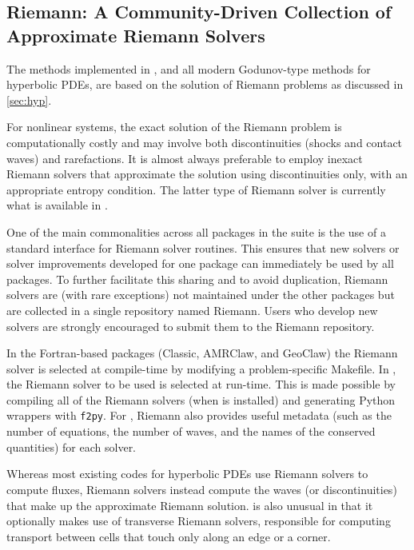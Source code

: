 %
%

\subsection{Riemann: A Community-Driven Collection of Approximate Riemann
Solvers}\label{sec:riemann}

The methods implemented in \clawpack, and all modern Godunov-type methods for
hyperbolic PDEs, are based on the solution of Riemann problems as discussed
in \cref{sec:hyp}.  

For nonlinear systems, the exact solution of the Riemann problem is
computationally costly and may involve both discontinuities (shocks and contact
waves) and rarefactions.  It is almost always preferable to employ inexact
Riemann solvers that approximate the solution using discontinuities only, with
an appropriate entropy condition.  The latter type of Riemann solver is
currently what is available in \clawpack.  

One of the main commonalities across all packages in the \clawpack suite is the
use of a standard interface for Riemann solver routines.  This ensures that new
solvers or solver improvements developed for one package can immediately
be used by all packages.  To further facilitate this sharing and to avoid 
duplication, Riemann solvers are (with rare exceptions) not maintained under
the other packages but are collected in a single repository named Riemann.
Users who develop new solvers are strongly encouraged to submit them to the
Riemann repository.

In the Fortran-based packages (Classic, AMRClaw, and GeoClaw) the Riemann solver
is selected at compile-time by modifying a problem-specific Makefile. In
\pyclaw, the Riemann solver to be used is selected at run-time.  This is made
possible by compiling all of the Riemann solvers (when \pyclaw is installed) and
generating Python wrappers with \texttt{f2py}.  For \pyclaw, Riemann also
provides useful metadata (such as the number of equations, the number of waves,
and the names of the conserved quantities) for each solver.

Whereas most existing codes for hyperbolic PDEs use Riemann solvers to
compute fluxes, \clawpack Riemann solvers instead compute the waves 
(or discontinuities) that make up the approximate Riemann solution.
\clawpack is also unusual in that it optionally makes use of transverse
Riemann solvers, responsible for computing transport between cells that
touch only along an edge or a corner.
